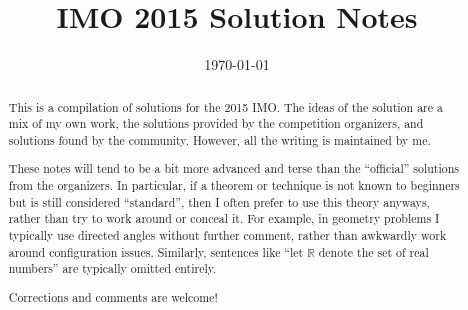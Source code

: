 \documentclass[11pt]{scrartcl}
\title{IMO 2015 Solution Notes}
\date{\today}
\begin{document}
\maketitle

\begin{abstract}
This is a compilation of solutions
for the 2015 IMO.
The ideas of the solution are a mix of my own work,
the solutions provided by the competition organizers,
and solutions found by the community.
However, all the writing is maintained by me.

These notes will tend to be a bit more advanced and terse than the ``official''
solutions from the organizers.
In particular, if a theorem or technique is not known to beginners
but is still considered ``standard'', then I often prefer to
use this theory anyways, rather than try to work around or conceal it.
For example, in geometry problems I typically use directed angles
without further comment, rather than awkwardly work around configuration issues.
Similarly, sentences like ``let $\mathbb{R}$ denote the set of real numbers''
are typically omitted entirely.

Corrections and comments are welcome!
\end{abstract}

\tableofcontents
\newpage

\addtocounter{section}{-1}
\end{document}
